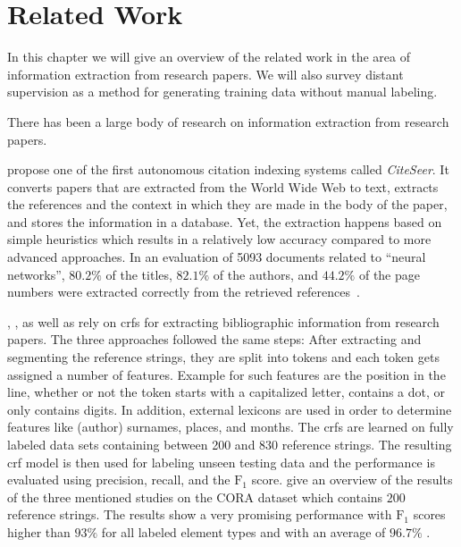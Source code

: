 \chapter{Related Work}\label{cha:related-work}
In this chapter we will give an overview of the related work in the area of information extraction from research papers.
We will also survey \gls{distant supervision} as a method for generating training data without manual labeling.

\bigskip

There has been a large body of research on information extraction from research papers.

\citet{giles1998citeseer} propose one of the first autonomous citation indexing systems called \emph{CiteSeer}.
It converts papers that are extracted from the World Wide Web to text, extracts the references and the context in which they are made in the body of the paper, and stores the information in a database.
Yet, the extraction happens based on simple heuristics which results in a relatively low accuracy compared to more advanced approaches.
In an evaluation of \num{5093} documents related to ``neural networks'', $80.2\%$ of the titles, $82.1\%$ of the authors, and $44.2\%$ of the page numbers were extracted correctly from the retrieved references~\cite{giles1998citeseer}.


\citet{peng2004accurate}, \citet{councill2008parscit}, as well as \citet{groza2012reference} rely on \glspl{crf} for extracting bibliographic information from research papers.
The three approaches followed the same steps:
After extracting and segmenting the reference strings, they are split into tokens and each token gets assigned a number of features.
Example for such features are the position in the line, whether or not the token starts with a capitalized letter, contains a dot, or only contains digits.
In addition, external lexicons are used in order to determine features like (author) surnames, places, and months.
The \glspl{crf} are learned on fully labeled data sets containing between 200 and 830 reference strings.
The resulting \gls{crf} model is then used for labeling unseen testing data and the performance is evaluated using precision, recall, and the $\text{F}_1$ score.
\citet{groza2012reference} give an overview of the results of the three mentioned studies on the CORA dataset which contains $200$ reference strings.
The results show a very promising performance with $\text{F}_1$ scores higher than $93\%$ for all labeled element types and with an average of $96.7\%$ \citep{groza2012reference}.

